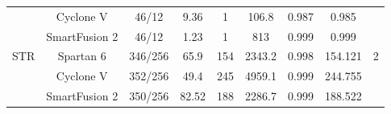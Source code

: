 \begin{table}[htbp]
{\begin{tabular}{|c|c|c|c|c|c|c|c|c|}
          & Cyclone V & 46/12 & 9.36  & 1     & 106.8 & 0.987 & 0.985 &  \\
          & SmartFusion 2 & 46/12 & 1.23  & 1     & 813   & 0.999 & 0.999 &  \\
    \hline
    \multirow{3}[2]{*}{STR} & Spartan 6 & 346/256 & 65.9  & 154   & 2343.2 & 0.998 & 154.121 & \multirow{3}[2]{*}{2} \\
          & Cyclone V & 352/256 & 49.4  & 245   & 4959.1 & 0.999 & 244.755 &  \\
          & SmartFusion 2 & 350/256 & 82.52 & 188   & 2286.7 & 0.999 & 188.522 &  \\
    \hline
    \end{tabular}%
}
  \label{tab:addlabel}%

\end{table}%


